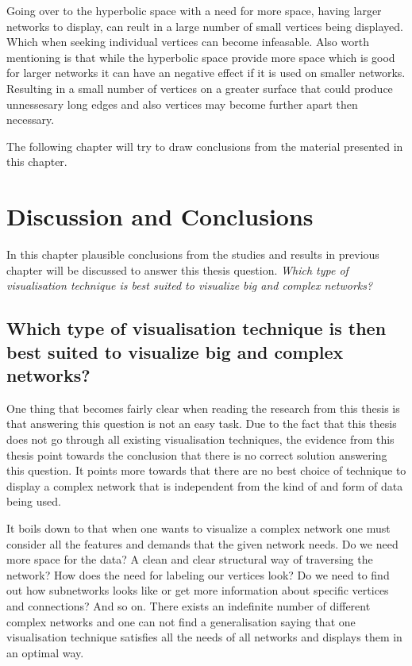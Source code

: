\documentclass[a4paper,11pt]{kth-mag}
\begin{document}
Going over to the hyperbolic space with a need for more space, having larger networks to display, can reult in a large number of small vertices being displayed.
Which when seeking individual vertices can become infeasable.
Also worth mentioning is that while the hyperbolic space provide more space which is good for larger networks it can 
have an negative effect if it is used on smaller networks. Resulting in a small number of vertices on a greater surface that could produce unnessesary long edges and also vertices
may become further apart then necessary.

The following chapter will try to draw conclusions from the material presented in this chapter.
\chapter{Discussion and Conclusions}
\label{chapter:five}
In this chapter plausible conclusions from the studies and results in previous chapter will be discussed to answer this thesis question.
\emph{Which type of visualisation technique is best suited to visualize big and complex networks?}\\

\section{Which type of visualisation technique is then best suited to visualize big and complex networks?}
\label{sec:conclution}
One thing that becomes fairly clear when reading the research from this thesis is that answering this question
is not an easy task. Due to the fact that this thesis does not go through all existing visualisation techniques,
the evidence from this thesis point towards the conclusion that there is no correct solution answering this
question. It points more towards that there are no best choice of technique to display a complex network that is
independent from the kind of and form of data being used.

It boils down to that when one wants to visualize a complex network one must consider all the features and demands
that the given network needs. Do we need more space for the data? A clean and clear structural way of traversing the network?
How does the need for labeling our vertices look? Do we need to find out how subnetworks looks like or get more information 
about specific vertices and connections? And so on. There exists an indefinite number of different complex networks
and one can not find a generalisation saying that one visualisation technique satisfies all the needs of all networks and 
displays them in an optimal way.
\end{document}
